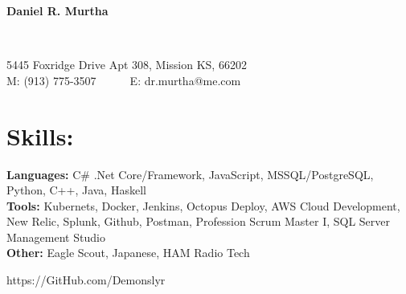 \documentclass{res}
\begin{document}
\begin{resume}
\begin{changemargin}{-0.5in}{0in}
	\begin{center}
		\begin{Huge}
		\textbf{Daniel R. Murtha}
		\end{Huge}
	\\
		\begin{normalsize}
			5445 Foxridge Drive Apt 308, Mission KS, 66202\\
			M: (913) 775-3507~~~~~~E: dr.murtha@me.com
		\end{normalsize}
	\end{center}
\end{changemargin}\vspace{-5pt}
 \section{Skills:}\vspace{-10pt}
 \begin{minipage}{0.8\linewidth}
 	\begin{small}
 		\begin{flushleft}
 			{\bf Languages: }C\# .Net Core/Framework, JavaScript, MSSQL/PostgreSQL, Python, C++, Java, Haskell\\
 			{\bf Tools: }Kubernets, Docker, Jenkins, Octopus Deploy, AWS Cloud Development, New Relic, Splunk, Github, Postman, Profession Scrum Master I, SQL Server Management Studio \\
			{\bf Other: } Eagle Scout, Japanese, HAM Radio Tech
 		\end{flushleft}
 	\end{small}   
 \end{minipage}
 \begin{minipage}{0.2\linewidth}
 	\begin{small}   
		\begin{flushright}
			https://GitHub.com/Demonslyr\\
		\end{flushright}     
 	\end{small}   
 \end{minipage}\vspace{-10pt}
 

\end{resume}
\end{document}
